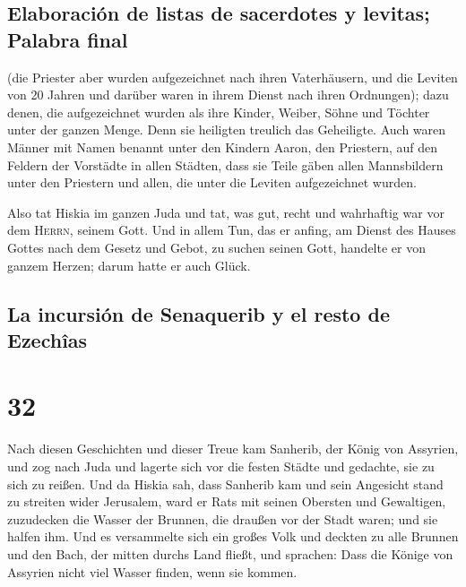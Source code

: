 \hypertarget{elaboraciuxf3n-de-listas-de-sacerdotes-y-levitas-palabra-final}{%
\subsection{Elaboración de listas de sacerdotes y levitas; Palabra
final}\label{elaboraciuxf3n-de-listas-de-sacerdotes-y-levitas-palabra-final}}

 (die Priester aber wurden aufgezeichnet nach ihren
Vaterhäusern, und die Leviten von 20 Jahren und darüber waren in ihrem
Dienst nach ihren Ordnungen);  dazu denen, die
aufgezeichnet wurden als ihre Kinder, Weiber, Söhne und Töchter unter
der ganzen Menge. Denn sie heiligten treulich das Geheiligte.
 Auch waren Männer mit Namen benannt unter den Kindern
Aaron, den Priestern, auf den Feldern der Vorstädte in allen Städten,
dass sie Teile gäben allen Mannsbildern unter den Priestern und allen,
die unter die Leviten aufgezeichnet wurden.

 Also tat Hiskia im ganzen Juda und tat, was gut, recht
und wahrhaftig war vor dem \textsc{Herrn}, seinem Gott. 
Und in allem Tun, das er anfing, am Dienst des Hauses Gottes nach dem
Gesetz und Gebot, zu suchen seinen Gott, handelte er von ganzem Herzen;
darum hatte er auch Glück.

\hypertarget{la-incursiuxf3n-de-senaquerib-y-el-resto-de-ezechuxeeas}{%
\subsection{La incursión de Senaquerib y el resto de
Ezechîas}\label{la-incursiuxf3n-de-senaquerib-y-el-resto-de-ezechuxeeas}}

\hypertarget{section-31}{%
\section{32}\label{section-31}}

 Nach diesen Geschichten und dieser Treue kam Sanherib,
der König von Assyrien, und zog nach Juda und lagerte sich vor die
festen Städte und gedachte, sie zu sich zu reißen.  Und da
Hiskia sah, dass Sanherib kam und sein Angesicht stand zu streiten wider
Jerusalem,  ward er Rats mit seinen Obersten und
Gewaltigen, zuzudecken die Wasser der Brunnen, die draußen vor der Stadt
waren; und sie halfen ihm.  Und es versammelte sich ein
großes Volk und deckten zu alle Brunnen und den Bach, der mitten durchs
Land fließt, und sprachen: Dass die Könige von Assyrien nicht viel
Wasser finden, wenn sie kommen.

